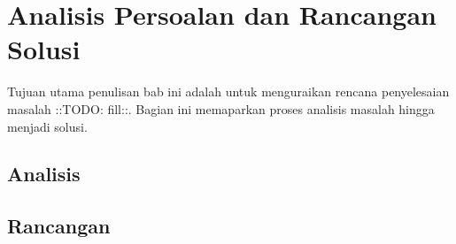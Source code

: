 \chapter{Analisis Persoalan dan Rancangan Solusi}

Tujuan utama penulisan bab ini adalah untuk menguraikan rencana penyelesaian masalah ::TODO: fill::. Bagian ini memaparkan proses analisis masalah hingga menjadi solusi.


\section{Analisis}







\section{Rancangan}


